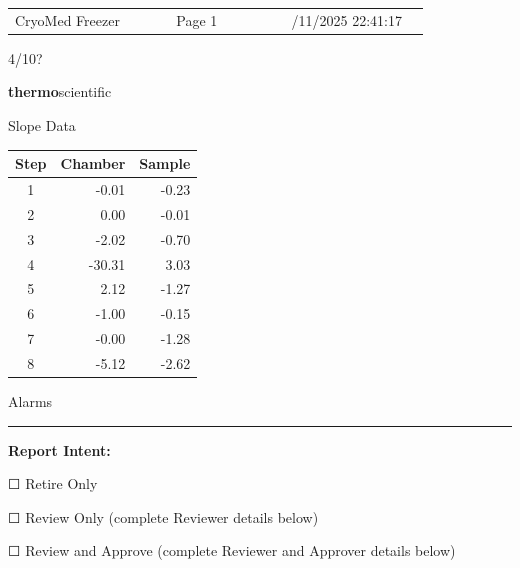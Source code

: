 \documentclass[UTF8,10pt,a4paper,fontset=fandol]{ctexart}
\newcommand{\fieldvalue}[1]{#1}
\newcommand{\handwritten}[1]{#1}
\newcommand{\checkboxfield}[1]{\ifstrequal{#1}{checked}{☑}{\ifstrequal{#1}{unclear}{?}{☐}}}
\begin{document}
\vfill

\noindent
\begin{tabular}{@{}p{0.35\linewidth}p{0.25\linewidth}p{0.30\linewidth}@{}}
CryoMed Freezer & \centering Page 1 & \raggedleft 12/11/2025 22:41:17
\end{tabular}

\handwritten{4/10?}

\newpage

\begin{flushright}
\textsf{\textbf{thermo}}\textsf{scientific}
\end{flushright}

\noindent
\begin{minipage}[t]{0.34\linewidth}
\centering
Slope Data

\vspace{0.15em}
\begin{tabular}{c r r}
\hline
Step & Chamber & Sample\\
\hline
1 & -0.01 & -0.23\\
2 & 0.00 & -0.01\\
3 & -2.02 & -0.70\\
4 & -30.31 & 3.03\\
5 & 2.12 & -1.27\\
6 & -1.00 & -0.15\\
7 & -0.00 & -1.28\\
8 & -5.12 & -2.62\\
\hline
\end{tabular}
\end{minipage}
\hfill
\begin{minipage}[t]{0.48\linewidth}
\centering
Alarms

\vspace{0.9em}
\rule{\linewidth}{0.4pt}
\end{minipage}

\vspace{1.2em}

\noindent\textbf{Report Intent:}

\fieldvalue{\checkboxfield{unchecked}} Retire Only

\fieldvalue{\checkboxfield{unchecked}} Review Only (complete Reviewer details below)

\fieldvalue{\checkboxfield{unchecked}} Review and Approve (complete Reviewer and Approver details below)
\end{document}
